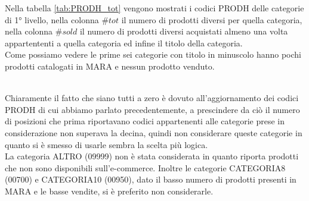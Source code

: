 \begin{minipage}[H]{0.50\textwidth}
\end{minipage}
\begin{minipage}[H]{0.50\textwidth}
Nella tabella \ref{tab:PRODH_tot} vengono mostrati i codici PRODH delle categorie di 1° livello, nella colonna $\#tot$ il numero di prodotti diversi per quella categoria, nella colonna $\#sold$ il numero di prodotti diversi acquistati almeno una volta appartententi a quella categoria ed infine il titolo della categoria.\\
Come possiamo vedere le prime sei categorie con titolo in minuscolo hanno pochi prodotti catalogati in MARA e nessun prodotto venduto.\\
\end{minipage}\\

Chiaramente il fatto che siano tutti a zero è dovuto all'aggiornamento dei codici PRODH di cui abbiamo parlato precedentemente, a prescindere da ciò il numero di posizioni che prima riportavano codici appartenenti alle categorie prese in considerazione non superava la decina, quindi non considerare queste categorie in quanto si è smesso di usarle sembra la scelta più logica.\\
La categoria ALTRO (09999) non è stata considerata in quanto riporta prodotti che non sono disponibili sull'e-commerce.
Inoltre le categorie CATEGORIA8 (00700) e CATEGORIA10 (00950), dato il basso numero di prodotti presenti in MARA e le basse vendite, si è preferito non considerarle.
